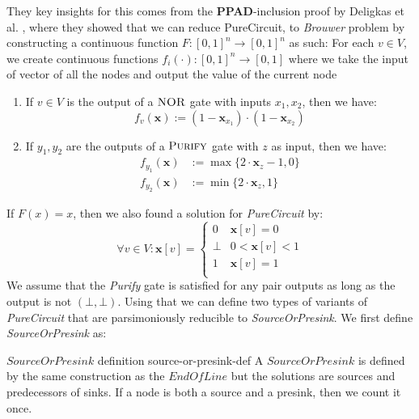 They key insights for this comes from the \textbf{PPAD}-inclusion proof
by Deligkas et al. \cite{deligkas_PureCircuitTightInapproximability_2024}, where they
showed that we can reduce PureCircuit, to \textit{Brouwer} problem by constructing
a continuous function $F: [0,1]^n \to [0,1]^n$ as such: For each $v \in V$, we create
continuous functions $f_i(\cdot): [0,1]^n \to [0,1]$ where we take the input of vector
of all the nodes and output the value of the current node
\begin{enumerate}
    \item If $v \in V$ is the output of a $\textsc{NOR}$ gate with inputs $x_1, x_2$, then we have:
          $$
              f_v(\mathbf{x}) := (1 - \mathbf{x}_{x_1}) \cdot (1 - \mathbf{x}_{x_2})
          $$
    \item If $y_1, y_2$ are the outputs of a  $\textsc{Purify}$ gate with $z$ as input, then we have:
          \begin{align*}
              f_{y_1}(\mathbf{x}) & := \max\{2 \cdot \mathbf{x}_{z} - 1, 0\} \\
              f_{y_2}(\mathbf{x}) & := \min\{2 \cdot \mathbf{x}_{z}, 1\}
          \end{align*}
\end{enumerate}
If $F(x) = x$, then we also found a solution for \textit{PureCircuit} by:
$$
    \forall v \in V: \mathbf{x}[v] = \begin{cases}
        0    & \mathbf{x}[v] = 0     \\
        \bot & 0 < \mathbf{x}[v] < 1 \\
        1    & \mathbf{x}[v] = 1     \\
    \end{cases}
$$
We assume that the \textit{Purify} gate is satisfied for any pair outputs
as long as the output is not $(\bot, \bot)$. Using that we can define two types of variants
of \textit{PureCircuit} that are parsimoniously reducible to \textit{SourceOrPresink}.
We first define \textit{SourceOrPresink} as:

\begin{definitionbox}{$\textit{SourceOrPresink}$ definition \cite{ikenmeyer_WhatWhatNot_2022}}{source-or-presink-def}
    \label{def:source-or-presink-def}
    A $\textit{SourceOrPresink}$ is defined by the same construction as the $\textit{EndOfLine}$
    but the solutions are sources and predecessors of sinks. If a node is both a source
    and a presink, then we count it once.
\end{definitionbox}


